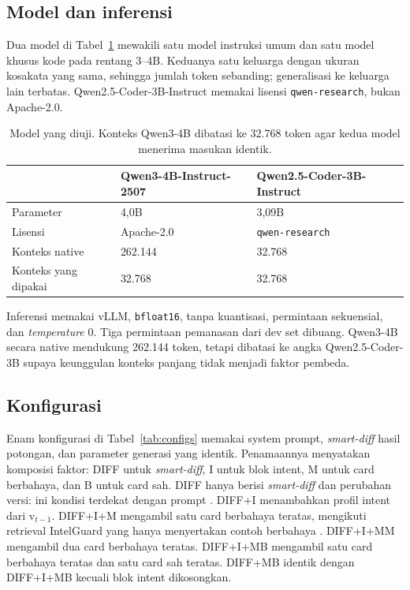 \documentclass[a4paper,fleqn]{cas-dc}
\begin{document}
\subsection{Model dan inferensi}\label{sec:models}

Dua model di Tabel~\ref{tab:models} mewakili satu model instruksi umum dan
satu model khusus kode pada rentang 3--4B. Keduanya
satu keluarga dengan ukuran kosakata yang sama, sehingga jumlah token
sebanding; generalisasi ke keluarga lain terbatas. Qwen2.5-Coder-3B-Instruct
memakai lisensi \texttt{qwen-research}, bukan Apache-2.0.

\begin{table}[t]
\caption{Model yang diuji. Konteks Qwen3-4B dibatasi ke 32.768 token agar
kedua model menerima masukan identik.}
\label{tab:models}
\small
\begin{tabular}{p{2.4cm} p{2.6cm} p{2.6cm}}
\hline
  & Qwen3-4B-Instruct-2507 & Qwen2.5-Coder-3B-Instruct \\
\hline
Parameter & 4,0B & 3,09B \\
Lisensi & Apache-2.0 & \texttt{qwen-research} \\
Konteks native & 262.144 & 32.768 \\
Konteks yang dipakai & 32.768 & 32.768 \\
\hline
\end{tabular}
\end{table}

Inferensi memakai vLLM, \texttt{bfloat16}, tanpa kuantisasi, permintaan
sekuensial, dan \emph{temperature} 0. Tiga permintaan pemanasan dari dev set
dibuang. Qwen3-4B secara native mendukung 262.144 token, tetapi dibatasi ke
angka Qwen2.5-Coder-3B supaya keunggulan konteks panjang tidak menjadi faktor
pembeda.

\subsection{Konfigurasi}\label{sec:configs}

Enam konfigurasi di Tabel~\ref{tab:configs} memakai system prompt,
\emph{smart-diff} hasil potongan, dan parameter generasi yang identik.
Penamaannya menyatakan komposisi faktor: DIFF untuk \emph{smart-diff}, I untuk
blok intent, M untuk card berbahaya, dan B untuk card sah. DIFF hanya berisi
\emph{smart-diff} dan perubahan versi: ini kondisi terdekat dengan prompt
\citet{wyss2025evaluating}. DIFF+I menambahkan profil intent dari
$\mathrm{v}_{t-1}$. DIFF+I+M mengambil satu card berbahaya teratas, mengikuti
retrieval IntelGuard yang hanya menyertakan contoh berbahaya
\citep{guo2026bridging}. DIFF+I+MM mengambil dua card berbahaya teratas.
DIFF+I+MB mengambil satu card berbahaya teratas dan satu card sah teratas.
DIFF+MB identik dengan DIFF+I+MB kecuali blok intent dikosongkan.
\end{document}
